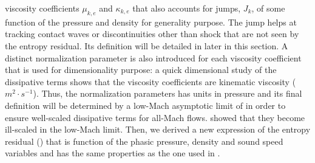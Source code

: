 \documentclass[preprint,10pt]{elsarticle}
\begin{document}
viscosity coefficients $\mu_{k,e}$ and $\kappa_{k,e}$ that also accounts for jumps, $J_k$, of some function of the pressure and density for generality purpose. 
The jump helps at tracking contact waves or discontinuities other than shock that are not seen by the entropy residual. Its definition will be detailed in later in 
this section. A distinct normalization parameter is also introduced for each viscosity coefficient that is used for dimensionality purpose: a quick dimensional 
study of the dissipative terms shows that the viscosity coefficients are kinematic viscosity ($m^2 \cdot s^{-1}$). Thus, the normalization parameters has units in 
pressure and its final definition will be determined by a low-Mach asymptotic limit of  in order to ensure well-scaled dissipative terms for all-Mach 
flows.
showed that they become ill-scaled in the low-Mach limit. Then, we derived a new expression of the entropy residual () that is function of 
the phasic pressure, density and sound speed variables and has the same properties as the one used in \cite{jlg1, jlg2, jlg3}. 
%
\end{document}
